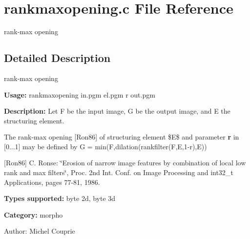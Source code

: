 \section{rankmaxopening.c File Reference}
\label{rankmaxopening_8c}
rank-max opening  




\label{_details}
\subsection{Detailed Description}
rank-max opening 

{\bf Usage:} rankmaxopening in.pgm el.pgm r out.pgm

{\bf Description:} Let F be the input image, G be the output image, and E the structuring element.

The rank-max opening [Ron86] of structuring element \$E\$ and parameter {\bf r} in [0...1] may be defined by G = min(F,dilation(rankfilter(F,E,1-r),E))

[Ron86] C. Ronse: \char`\"{}Erosion of narrow image features by combination of local low rank and max filters\char`\"{}, Proc. 2nd Int. Conf. on Image Processing and int32\_\-t Applications, pages 77-81, 1986.

{\bf Types supported:} byte 2d, byte 3d

{\bf Category:} morpho

\begin{Desc}
\item[Author:]Michel Couprie \end{Desc}
